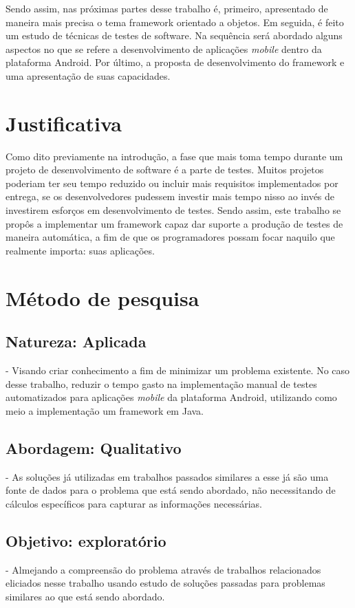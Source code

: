 \documentclass[
    12pt,       %
    openright,      %
    twoside,      %
    a4paper,      %
    english,      %
    french,       %
    spanish,      %
    brazil,       %
    ]{abntex2}
\begin{document}
  Sendo assim, nas próximas partes desse trabalho é, primeiro, apresentado de maneira
  mais precisa o tema framework orientado a objetos. Em seguida, é feito um estudo de
  técnicas de testes de software. Na sequência será abordado alguns aspectos no que se refere a
  desenvolvimento de aplicações \textit{mobile} dentro da plataforma Android. Por último, a
  proposta de desenvolvimento do framework e uma apresentação de suas capacidades.

  \section{Justificativa}
      Como dito previamente na introdução, a fase que mais toma tempo durante
      um projeto de desenvolvimento de software é a parte de testes. Muitos
      projetos poderiam ter seu tempo reduzido ou incluir mais requisitos
      implementados por entrega, se os desenvolvedores pudessem investir mais
      tempo nisso ao invés de investirem esforços em desenvolvimento de testes.
      Sendo assim, este trabalho se propôs a implementar um framework capaz dar
      suporte a produção de testes de maneira automática, a fim de que os
      programadores possam focar naquilo que realmente importa: suas aplicações.

  \section{Método de pesquisa}

    \subsection{Natureza: Aplicada} - Visando criar conhecimento a fim de minimizar
    um problema existente. No caso desse trabalho, reduzir o tempo gasto na
    implementação manual de testes automatizados para aplicações \textit{mobile} da
    plataforma Android, utilizando como meio a implementação um framework
    em Java.

    \subsection{Abordagem: Qualitativo} - As soluções já utilizadas em trabalhos
    passados similares a esse já são uma fonte de dados para o problema que
    está sendo abordado, não necessitando de cálculos específicos para
    capturar as informações necessárias.

    \subsection{Objetivo: exploratório} - Almejando a compreensão do problema através
    de trabalhos relacionados eliciados nesse trabalho usando estudo de soluções
    passadas para problemas similares ao que está sendo abordado.
\end{document}
